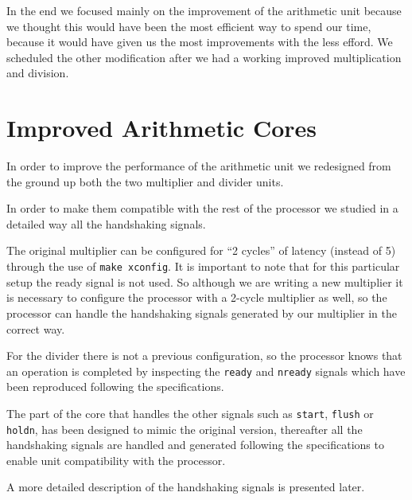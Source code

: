 In the end we focused mainly on the improvement of the arithmetic unit because we thought this would have been the most efficient way to spend our time, because it would have given us the most improvements with the less efford. We scheduled the other modification after we had a working improved multiplication and division.

\pagebreak
\section{Improved Arithmetic Cores}

In order to improve the performance of the arithmetic unit we redesigned from the ground up both the
two multiplier and divider units.

In order to make them compatible with the rest of the processor we studied in a detailed way all
the handshaking signals.

The original multiplier can be configured for ``2 cycles'' of latency (instead of 5) through the use of \texttt{make xconfig}.
It is important to note that for this particular setup the ready signal is not used.
So although we are writing a new multiplier it is necessary to configure the
processor with a 2-cycle multiplier as well, so the processor can handle the
handshaking signals generated by our multiplier in the correct way.

For the divider there is not a previous configuration, so the processor knows that an operation is
completed by inspecting the \texttt{ready} and \texttt{nready} signals which have been reproduced following the
specifications.

The part of the core that handles the other signals such as \texttt{start}, \texttt{flush} or \texttt{holdn}, has been designed
to mimic the original version, thereafter all the handshaking signals are handled and generated following the
specifications to enable unit compatibility with the processor.

A more detailed description of the handshaking signals is presented later.